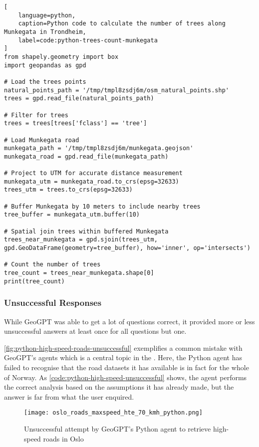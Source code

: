 \begin{lstlisting}[
    language=python,
    caption=Python code to calculate the number of trees along Munkegata in Trondheim,
    label=code:python-trees-count-munkegata
]
from shapely.geometry import box
import geopandas as gpd

# Load the trees points
natural_points_path = '/tmp/tmpl8zsdj6m/osm_natural_points.shp'
trees = gpd.read_file(natural_points_path)

# Filter for trees
trees = trees[trees['fclass'] == 'tree']

# Load Munkegata road
munkegata_path = '/tmp/tmpl8zsdj6m/munkegata.geojson'
munkegata_road = gpd.read_file(munkegata_path)

# Project to UTM for accurate distance measurement
munkegata_utm = munkegata_road.to_crs(epsg=32633)
trees_utm = trees.to_crs(epsg=32633)

# Buffer Munkegata by 10 meters to include nearby trees
tree_buffer = munkegata_utm.buffer(10)

# Spatial join trees within buffered Munkegata
trees_near_munkegata = gpd.sjoin(trees_utm, gpd.GeoDataFrame(geometry=tree_buffer), how='inner', op='intersects')

# Count the number of trees
tree_count = trees_near_munkegata.shape[0]
print(tree_count)

\end{lstlisting}

\subsubsection{Unsuccessful Responses}

While GeoGPT was able to get a lot of questions correct, it provided more or less unsuccessful answers at least once for all questions but one.

\autoref{fig:python-high-speed-roads-unsuccessful} exemplifies a common mistake with GeoGPT's agents which is a central topic in the . Here, the Python agent has failed to recognise that the road datasets it has available is in fact for the whole of Norway. As \autoref{code:python-high-speed-unsuccessful} shows, the agent performs the correct analysis based on the assumptions it has already made, but the answer is far from what the user enquired.

\begin{figure}
    \centering
    \texttt{[image: oslo\_roads\_maxspeed\_hte\_70\_kmh\_python.png]}
    \caption{Unsuccessful attempt by GeoGPT's Python agent to retrieve high-speed roads in Oslo}
    \label{fig:python-high-speed-roads-unsuccessful}
\end{figure}

